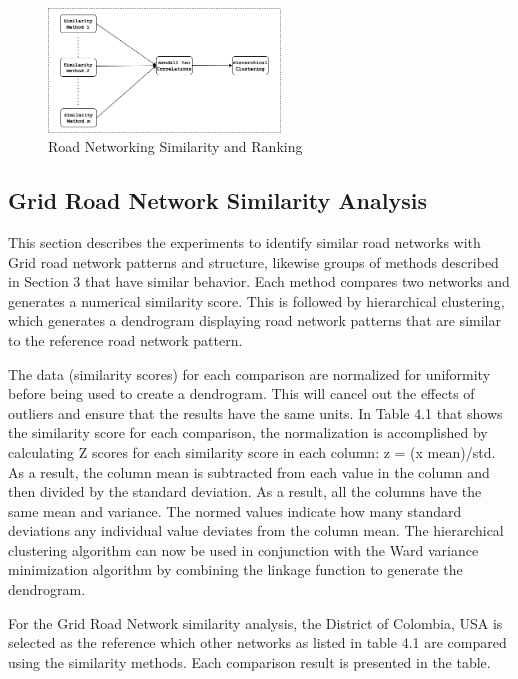 \begin{figure}[h]
\centering
\includegraphics[width=0.55\textwidth,center]{picture/ranking.png}
\caption[Miniaturtrichter]{Road Networking Similarity and Ranking}
\label{fig:network ranking}
\end{figure}


\subsection{Grid Road Network Similarity Analysis}
This section describes the experiments to identify similar road networks with Grid road network patterns and structure, likewise groups of methods described in Section 3 that have similar behavior.
Each method compares two networks and generates a numerical similarity score. This is followed by hierarchical clustering, which generates a dendrogram displaying road network patterns that are similar to the reference road network pattern.

The data (similarity scores) for each comparison are normalized for uniformity before being used to create a dendrogram. This will cancel out the effects of outliers and ensure that the results have the same units. In Table 4.1 that shows the similarity score for each comparison, the normalization is accomplished by calculating Z scores for each similarity score in each column: z = (x mean)/std. As a result, the column mean is subtracted from each value in the column and then divided by the standard deviation. As a result, all the columns have the same mean and variance. The normed values indicate how many standard deviations any individual value deviates from the column mean.
The hierarchical clustering algorithm can now be used in conjunction with the Ward variance minimization algorithm by combining the linkage function to generate the dendrogram.

For the Grid Road Network similarity analysis, the District of Colombia, USA is selected as the reference which other networks as listed in table 4.1 are compared using the similarity methods. Each comparison result is presented in the table.

